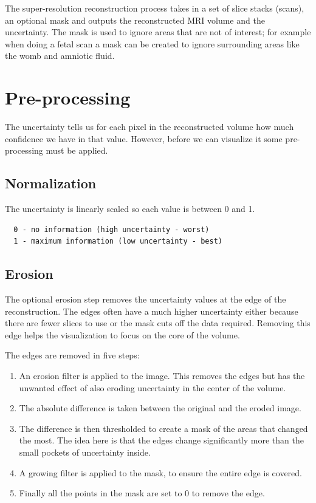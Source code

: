 The super-resolution reconstruction process takes in a set of slice stacks (scans), an optional mask and outputs the reconstructed MRI volume and the uncertainty. The mask is used to ignore areas that are not of interest; for example when doing a fetal scan a mask can be created to ignore surrounding areas like the womb and amniotic fluid.

\section{Pre-processing}\label{section:preprocessing}
The uncertainty tells us for each pixel in the reconstructed volume how much confidence we have in that value. However, before we can visualize it some pre-processing must be applied. 

\subsection*{Normalization}
The uncertainty is linearly scaled so each value is between 0 and 1.

\begin{verbatim}
  0 - no information (high uncertainty - worst)
  1 - maximum information (low uncertainty - best)
\end{verbatim}

\subsection*{Erosion}
The optional erosion step removes the uncertainty values at the edge of the reconstruction. The edges often have a much higher uncertainty either because there are fewer slices to use or the mask cuts off the data required. Removing this edge helps the visualization to focus on the core of the volume.

The edges are removed in five steps:

\begin{enumerate}
  \item An erosion filter is applied to the image. This removes the edges but has the unwanted effect of also eroding uncertainty in the center of the volume.
  \item The absolute difference is taken between the original and the eroded image.
  \item The difference is then thresholded to create a mask of the areas that changed the most. The idea here is that the edges change significantly more than the small pockets of uncertainty inside.
  \item A growing filter is applied to the mask, to ensure the entire edge is covered.
  \item Finally all the points in the mask are set to 0 to remove the edge.
\end{enumerate}

